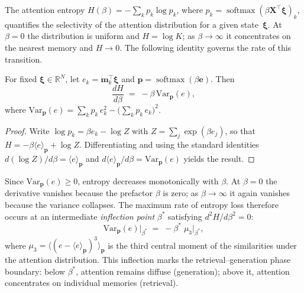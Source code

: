 The attention entropy $H(\beta) = -\sum_k p_k \log p_k$, where $p_k = \operatorname{softmax}(\beta\mathbf{X}^{\top}\boldsymbol{\xi})_k$, quantifies the selectivity of the attention distribution for a given state~$\boldsymbol{\xi}$. At $\beta=0$ the distribution is uniform and $H=\log K$; as $\beta\to\infty$ it concentrates on the nearest memory and $H\to 0$. The following identity governs the rate of this transition.

\begin{proposition}\label{prop:entropy-derivative}
For fixed $\boldsymbol{\xi}\in\mathbb{R}^N$, let $e_k = \mathbf{m}_k^{\top}\boldsymbol{\xi}$ and $\mathbf{p}=\operatorname{softmax}(\beta\mathbf{e})$. Then
\begin{equation}\label{eq:entropy-deriv}
\frac{dH}{d\beta} \;=\; -\beta\,\mathrm{Var}_{\mathbf{p}}(e),
\end{equation}
where $\mathrm{Var}_{\mathbf{p}}(e) = \sum_k p_k\,e_k^2 - \bigl(\sum_k p_k\,e_k\bigr)^{\!2}$.
\end{proposition}

\begin{proof}
Write $\log p_k = \beta e_k - \log Z$ with $Z=\sum_j\exp(\beta e_j)$, so that $H = -\beta\langle e\rangle_{\mathbf{p}} + \log Z$. Differentiating and using the standard identities $d(\log Z)/d\beta = \langle e\rangle_{\mathbf{p}}$ and $d\langle e\rangle_{\mathbf{p}}/d\beta = \mathrm{Var}_{\mathbf{p}}(e)$ yields the result.
\end{proof}

Since $\mathrm{Var}_{\mathbf{p}}(e)\ge 0$, entropy decreases monotonically with $\beta$. At $\beta=0$ the derivative vanishes because the prefactor $\beta$ is zero; as $\beta\to\infty$ it again vanishes because the variance collapses. The maximum rate of entropy loss therefore occurs at an intermediate \emph{inflection point} $\beta^{*}$ satisfying $d^{2}H/d\beta^{2}=0$:
\begin{equation}\label{eq:inflection}
\mathrm{Var}_{\mathbf{p}}(e)\big|_{\beta^{*}} \;=\; -\beta^{*}\;\mu_{3}\big|_{\beta^{*}},
\end{equation}
where $\mu_3 = \langle(e - \langle e\rangle_{\mathbf{p}})^3\rangle_{\mathbf{p}}$ is the third central moment of the similarities under the attention distribution. This inflection marks the retrieval--generation phase boundary: below $\beta^{*}$, attention remains diffuse (generation); above it, attention concentrates on individual memories (retrieval).

